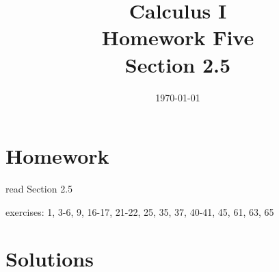 \documentclass[letterpaper, landscape]{exam}
\title{Calculus I \\ Homework Five \\ Section 2.5}
\author{}
\date{\today}
\begin{document}
  \maketitle

  \section{Homework}
    \begin{itemize*}
      \item read Section 2.5
      \item exercises: 1, 3-6, 9, 16-17, 21-22, 25, 35, 37, 40-41, 45, 61, 63, 65
    \end{itemize*}

  \ifprintanswers

  \section{Solutions}
\end{document}
